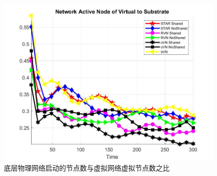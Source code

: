 \begin{frame}
\begin{figure}[htbp]
\begin{minipage}{0.4\textwidth}
\centering
\includegraphics[width=\textwidth]{figures/ActiveNodeSubVir2VirNet}
\caption{底层物理网络启动的节点数与虚拟网络虚拟节点数之比}\label{fig:ActiveNodeSubVir2VirNet}
\end{minipage}\vspace{\baselineskip}
\end{figure}
\end{frame}

